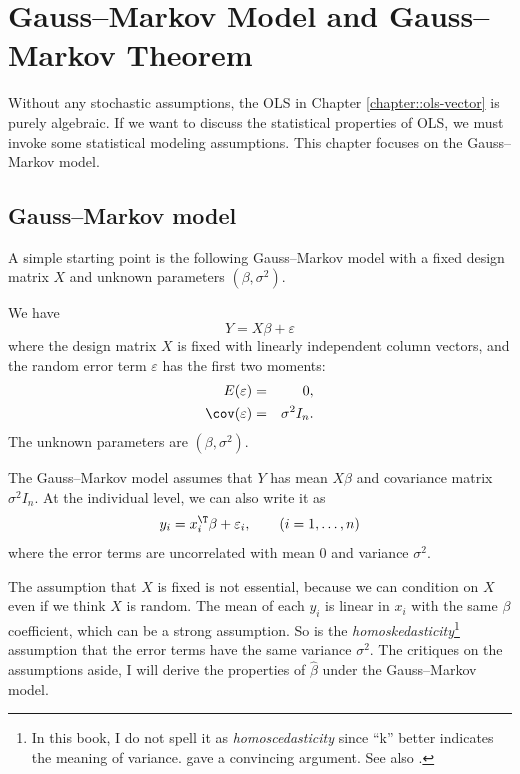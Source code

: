  
\chapter{Gauss--Markov Model and Gauss--Markov Theorem}\label{chapter::gauss-markov}
 
 
 Without any stochastic assumptions, the OLS in Chapter \ref{chapter::ols-vector}  is purely algebraic. If we want to discuss the statistical properties of OLS, we must invoke some statistical modeling assumptions. This chapter focuses on the Gauss--Markov model. 


 

\section{Gauss--Markov model}

  A simple starting point is the
following Gauss--Markov model with a fixed design matrix $X$ and unknown
parameters $(\beta,\sigma^{2})$. 

\begin{assumption}\label{assume::gm-model}
We have
\[
Y=X\beta+\varepsilon
\]
where the design matrix $X$ is fixed with linearly independent column vectors, and the random error term $\varepsilon$ has the first two moments: 
\begin{eqnarray*}
E(\varepsilon)  &=&  0,\\ 
\cov(\varepsilon) &=& \sigma^{2}I_{n} . 
\end{eqnarray*}
The unknown parameters are $ (\beta,   \sigma^{2} )$.
\end{assumption}

The Gauss--Markov model assumes that $Y$ has mean $X\beta$ and covariance
matrix $\sigma^{2}I_{n}.$ At the individual level, we can also write
it as
\[
y_{i}=x_{i}^{\T}\beta+\varepsilon_{i},\qquad(i=1,\ldots,n)
\]
where the error terms are uncorrelated with mean $0$ and variance
$\sigma^{2}$. 


The assumption that $X$ is fixed is not essential, because we can condition on $X$ even if we think $X$ is random. The mean of each $y_i$ is linear in $x_i$ with the same $\beta$ coefficient, which can be a strong assumption. So is the {\it homoskedasticity}\footnote{In this book, I do not spell it as {\it homoscedasticity} since ``k'' better indicates the meaning of variance. \citet{mcculloch1985miscellanea} gave a convincing argument. See also \citet{paloyo2014did}.
} assumption that the error terms have the same variance $\sigma^2$. The critiques on the assumptions aside, I will  derive the properties of $\hat{\beta}$
under the Gauss--Markov model. 


